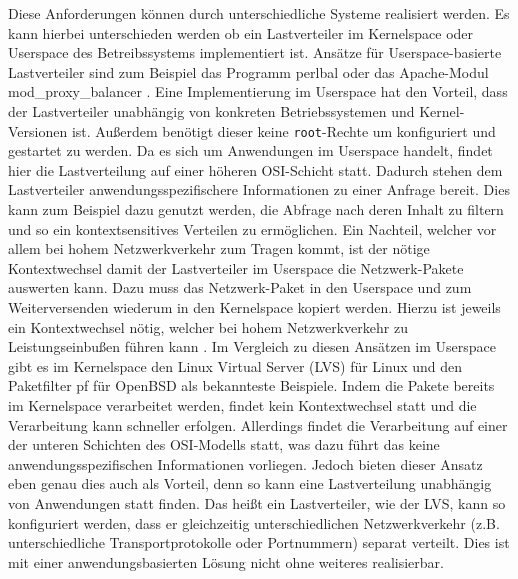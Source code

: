 \documentclass[a4paper, 12pt, BCOR10mm, DIV12, toc=bibliography, toc=listof, german]{scrbook}
\begin{document}
			Diese Anforderungen können durch unterschiedliche Systeme realisiert werden. Es kann hierbei
			unterschieden werden ob ein Lastverteiler im Kernelspace oder Userspace des Betreibssystems
			implementiert ist. Ansätze für Userspace-basierte Lastverteiler sind zum Beispiel das Programm
			perlbal \cite{perlbal} oder das Apache-Modul mod\_proxy\_balancer \cite{modproxy}.  Eine
			Implementierung im Userspace hat den Vorteil, dass der Lastverteiler unabhängig von konkreten
			Betriebssystemen und Kernel-Versionen ist. Außerdem benötigt dieser keine \texttt{root}-Rechte
			um konfiguriert und gestartet zu werden. Da es sich um Anwendungen im Userspace handelt,
			findet hier die Lastverteilung auf einer höheren OSI-Schicht \cite{tanenbaum1988} statt.
			Dadurch stehen dem Lastverteiler anwendungsspezifischere Informationen zu einer Anfrage
			bereit. Dies kann zum Beispiel dazu genutzt werden, die Abfrage nach deren Inhalt zu filtern
			und so ein kontextsensitives Verteilen zu ermöglichen.  Ein Nachteil, welcher vor allem bei
			hohem Netzwerkverkehr zum Tragen kommt, ist der nötige Kontextwechsel damit der Lastverteiler
			im Userspace die Netzwerk-Pakete auswerten kann. Dazu muss das Netzwerk-Paket in den Userspace
			und zum Weiterversenden wiederum in den Kernelspace kopiert werden. Hierzu ist jeweils ein
			Kontextwechsel nötig, welcher bei hohem Netzwerkverkehr zu Leistungseinbußen führen kann
			\cite{boehme2006}.  Im Vergleich zu diesen Ansätzen im Userspace gibt es im Kernelspace den
			Linux Virtual Server (LVS) \cite{lvs,zhang2000} für Linux und den Paketfilter pf \cite{pf} für
			OpenBSD als bekannteste Beispiele.  Indem die Pakete bereits im Kernelspace verarbeitet
			werden, findet kein Kontextwechsel statt und die Verarbeitung kann schneller erfolgen.
			Allerdings findet die Verarbeitung auf einer der unteren Schichten des OSI-Modells statt, was
			dazu führt das keine anwendungsspezifischen Informationen vorliegen. Jedoch bieten dieser
			Ansatz eben genau dies auch als Vorteil, denn so kann eine Lastverteilung unabhängig von
			Anwendungen statt finden.  Das heißt ein Lastverteiler, wie der LVS, kann so konfiguriert
			werden, dass er gleichzeitig unterschiedlichen Netzwerkverkehr (z.B. unterschiedliche
			Transportprotokolle oder Portnummern) separat verteilt. Dies ist mit einer anwendungsbasierten
			Lösung nicht ohne weiteres realisierbar.
\end{document}
